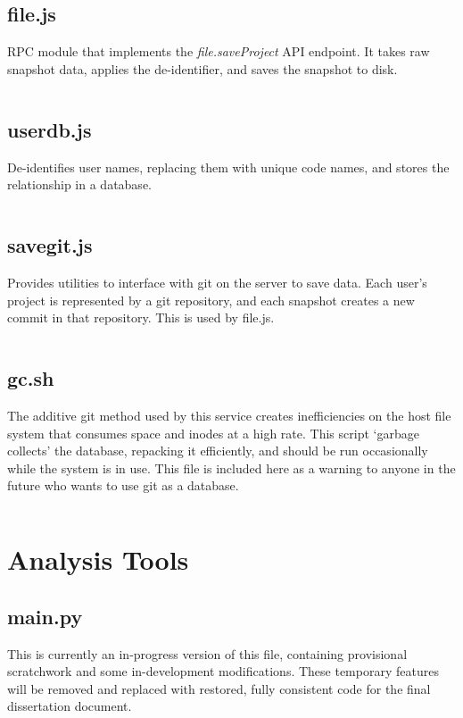 \subsection{file.js}
\label{src:file.js}
RPC module that implements the \emph{file.saveProject} API endpoint. It takes raw snapshot data, applies the de-identifier, and saves the snapshot to disk.
\inputminted{javascript}{src/snapshot-service/file.js}

\subsection{userdb.js}
\label{src:userdb.js}
De-identifies user names, replacing them with unique code names, and stores the relationship in a database.
\inputminted{javascript}{src/snapshot-service/userdb.js}

\subsection{savegit.js}
\label{src:savegit.js}
Provides utilities to interface with git on the server to save data. Each user's project is represented by a git repository, and each snapshot creates a new commit in that repository. This is used by file.js.
\inputminted{javascript}{src/snapshot-service/savegit.js}

\subsection{gc.sh}
\label{src:gc.sh}
The additive git method used by this service creates inefficiencies on the host file system that consumes space and inodes at a high rate. This script `garbage collects' the database, repacking it efficiently, and should be run occasionally while the system is in use. This file is included here as a warning to anyone in the future who wants to use git as a database.
\inputminted{bash}{src/snapshot-service/gc.sh}


\section{Analysis Tools}

\subsection{main.py}
This is currently an in-progress version of this file, containing provisional scratchwork and some in-development modifications. These temporary features will be removed and replaced with restored, fully consistent code for the final dissertation document.
\inputminted[lastline=212]{python}{src/analysis/main.py}

